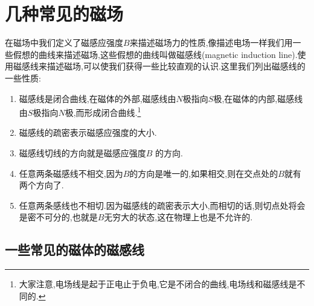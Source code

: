 \section{几种常见的磁场}

在磁场中我们定义了磁感应强度$B$来描述磁场力的性质,像描述电场一样我们用一些假想的曲线来描述磁场,这些假想的曲线叫做磁感线(magnetic induction line).使用磁感线来描述磁场,可以使我们获得一些比较直观的认识.这里我们列出磁感线的一些性质:

\begin{enumerate}
  \item 磁感线是闭合曲线,在磁体的外部,磁感线由$N$极指向$S$极,在磁体的内部,磁感线由$S$极指向$N$极,而形成闭合曲线.\footnote{大家注意,电场线是起于正电止于负电,它是不闭合的曲线,电场线和磁感线是不同的.}
  \item 磁感线的疏密表示磁感应强度的大小.
  \item 磁感线切线的方向就是磁感应强度$B$ 的方向.
  \item 任意两条磁感线不相交,因为$B$的方向是唯一的,如果相交,则在交点处的$B$就有两个方向了.
  \item 任意两条感线也不相切.因为磁感线的疏密表示大小,而相切的话,则切点处将会是密不可分的,也就是$B$无穷大的状态,这在物理上也是不允许的.
\end{enumerate}

\subsection{一些常见的磁体的磁感线}

